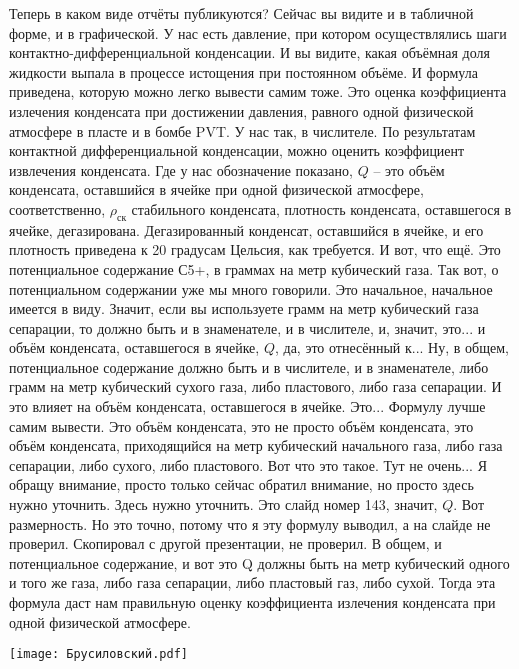 \documentclass[main.tex]{subfiles}
\begin{document}
Теперь в каком виде отчёты публикуются?
Сейчас вы видите и в табличной форме, и в графической.
У нас есть давление, при котором осуществлялись шаги контактно-дифференциальной конденсации.
И вы видите, какая объёмная доля жидкости выпала в процессе истощения при постоянном объёме.
И формула приведена, которую можно легко вывести самим тоже.
Это оценка коэффициента излечения конденсата при достижении давления, равного одной физической атмосфере в пласте и в бомбе PVT.
У нас так, в числителе.
По результатам контактной дифференциальной конденсации, можно оценить коэффициент извлечения конденсата.
Где у нас обозначение показано, $Q$ -- это объём конденсата, оставшийся в ячейке при одной физической атмосфере, соответственно, $\rho_{\text{ск}}$ стабильного конденсата, плотность конденсата, оставшегося в ячейке, дегазирована.
Дегазированный конденсат, оставшийся в ячейке, и его плотность приведена к 20 градусам Цельсия, как требуется.
И вот, что ещё.
Это потенциальное содержание С5+, в граммах на метр кубический газа.
Так вот, о потенциальном содержании уже мы много говорили.
Это начальное, начальное имеется в виду.
Значит, если вы используете грамм на метр кубический газа сепарации, то должно быть и в знаменателе, и в числителе, и, значит, это... и объём конденсата, оставшегося в ячейке, $Q$, да, это отнесённый к...
Ну, в общем, потенциальное содержание должно быть и в числителе, и в знаменателе, либо грамм на метр кубический сухого газа, либо пластового, либо газа сепарации.
И это влияет на объём конденсата, оставшегося в ячейке.
Это...
Формулу лучше самим вывести.
Это объём конденсата, это не просто объём конденсата, это объём конденсата, приходящийся на метр кубический начального газа, либо газа сепарации, либо сухого, либо пластового.
Вот что это такое.
Тут не очень...
Я обращу внимание, просто только сейчас обратил внимание, но просто здесь нужно уточнить.
Здесь нужно уточнить.
Это слайд номер 143, значит, $Q$.
Вот размерность.
Но это точно, потому что я эту формулу выводил, а на слайде не проверил.
Скопировал с другой презентации, не проверил.
В общем, и потенциальное содержание, и вот это Q должны быть на метр кубический одного и того же газа, либо газа сепарации, либо пластовый газ, либо сухой.
Тогда эта формула даст нам правильную оценку коэффициента излечения конденсата при одной физической атмосфере.

\begin{center}
\texttt{[image: Брусиловский.pdf]}
\end{center}
\end{document}
